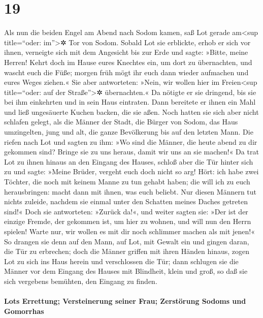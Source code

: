 \hypertarget{section-18}{%
\section{19}\label{section-18}}

 Als nun die beiden Engel am Abend nach Sodom kamen, saß
Lot gerade am\textless sup title=``oder: im''\textgreater✲ Tor von
Sodom. Sobald Lot sie erblickte, erhob er sich vor ihnen, verneigte sich
mit dem Angesicht bis zur Erde  und sagte: »Bitte, meine
Herren! Kehrt doch im Hause eures Knechtes ein, um dort zu übernachten,
und wascht euch die Füße; morgen früh mögt ihr euch dann wieder
aufmachen und eures Weges ziehen.« Sie aber antworteten: »Nein, wir
wollen hier im Freien\textless sup title=``oder: auf der
Straße''\textgreater✲ übernachten.«  Da nötigte er sie
dringend, bis sie bei ihm einkehrten und in sein Haus eintraten. Dann
bereitete er ihnen ein Mahl und ließ ungesäuerte Kuchen backen, die sie
aßen.  Noch hatten sie sich aber nicht schlafen gelegt,
als die Männer der Stadt, die Bürger von Sodom, das Haus umzingelten,
jung und alt, die ganze Bevölkerung bis auf den letzten Mann.
 Die riefen nach Lot und sagten zu ihm: »Wo sind die
Männer, die heute abend zu dir gekommen sind? Bringe sie zu uns heraus,
damit wir uns an sie machen!«  Da trat Lot zu ihnen hinaus
an den Eingang des Hauses, schloß aber die Tür hinter sich zu
 und sagte: »Meine Brüder, vergeht euch doch nicht so arg!
 Hört: ich habe zwei Töchter, die noch mit keinem Manne zu
tun gehabt haben; die will ich zu euch herausbringen: macht dann mit
ihnen, was euch beliebt. Nur diesen Männern tut nichts zuleide, nachdem
sie einmal unter den Schatten meines Daches getreten sind!«
 Doch sie antworteten: »Zurück da!«, und weiter sagten
sie: »Der ist der einzige Fremde, der gekommen ist, um hier zu wohnen,
und will nun den Herrn spielen! Warte nur, wir wollen es mit dir noch
schlimmer machen als mit jenen!« So drangen sie denn auf den Mann, auf
Lot, mit Gewalt ein und gingen daran, die Tür zu erbrechen;
 doch die Männer griffen mit ihren Händen hinaus, zogen
Lot zu sich ins Haus herein und verschlossen die Tür; 
dann schlugen sie die Männer vor dem Eingang des Hauses mit Blindheit,
klein und groß, so daß sie sich vergebens bemühten, den Eingang zu
finden.

\hypertarget{lots-errettung-versteinerung-seiner-frau-zerstuxf6rung-sodoms-und-gomorrhas}{%
\paragraph{Lots Errettung; Versteinerung seiner Frau; Zerstörung Sodoms
und
Gomorrhas}\label{lots-errettung-versteinerung-seiner-frau-zerstuxf6rung-sodoms-und-gomorrhas}}

